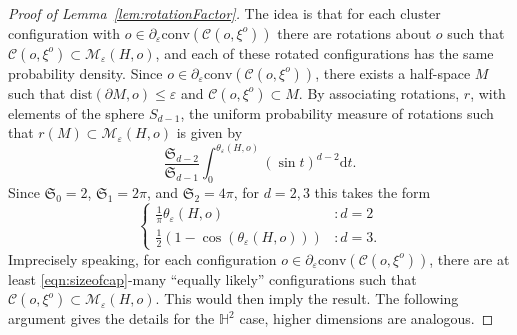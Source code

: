 \documentclass[10pt,a4paper,dvipsnames]{article}
\theoremstyle{definition}
\theoremstyle{remark}
\newcommand{\Mcal}{\mathcal{M}}
\newcommand{\HypTwo}{{\mathbb{H}^2}}
\newcommand{\dd}{\mathrm{d}} %
\newcommand{\C}{\mathscr {C}}
\newcommand{\convex}[1]{{\mathrm{conv}\left(#1\right)}}
\newcommand{\dist}[1]{\mathrm{dist}\left(#1\right)}
\newcommand{\orig}{o}
\numberwithin{equation}{section}
\begin{document}
\begin{proof}[Proof of Lemma~\ref{lem:rotationFactor}]
    The idea is that for each cluster configuration with $\orig\in\partial_\varepsilon\convex{\C\left(\orig,\xi^{\orig}\right)}$ there are rotations about $\orig$ such that $\C\left(\orig,\xi^{\orig}\right)\subset\Mcal_\varepsilon\left(H,\orig\right)$, and each of these rotated configurations has the same probability density. Since $\orig\in\partial_\varepsilon\convex{\C\left(\orig,\xi^{\orig}\right)}$, there exists a half-space $M$ such that $\dist{\partial M,\orig}\leq \varepsilon$ and $\C\left(\orig,\xi^{\orig}\right)\subset M$. By associating rotations, $r$, with elements of the sphere $S_{d-1}$, the uniform probability measure of rotations such that $r(M)\subset \Mcal_\varepsilon\left(H,\orig\right)$ is given by
    \begin{equation}
        \frac{\mathfrak{S}_{d-2}}{\mathfrak{S}_{d-1}}\int^{\theta_\varepsilon\left(H,\orig\right)}_0\left(\sin t\right)^{d-2}\dd t.
    \end{equation}
    Since $\mathfrak{S}_0=2$, $\mathfrak{S}_1=2\pi$, and $\mathfrak{S}_2=4\pi$, for $d=2,3$ this takes the form
    \begin{equation}
    \label{eqn:sizeofcap}
        \begin{cases}
            \frac{1}{\pi}\theta_\varepsilon\left(H,\orig\right) & \colon d=2\\
            \frac{1}{2}\left(1- \cos \left(\theta_\varepsilon\left(H,\orig\right)\right)\right) &\colon d=3.
        \end{cases}
    \end{equation}
    Imprecisely speaking, for each configuration $\orig\in\partial_\varepsilon\convex{\C\left(\orig,\xi^{\orig}\right)}$, there are at least \eqref{eqn:sizeofcap}-many ``equally likely'' configurations such that $\C\left(\orig,\xi^{\orig}\right)\subset\Mcal_\varepsilon\left(H,\orig\right)$. This would then imply the result. The following argument gives the details for the $\HypTwo$ case, higher dimensions are analogous. 


\end{proof}
\end{document}
